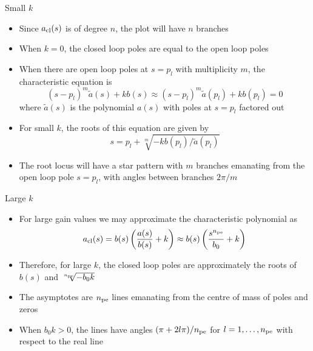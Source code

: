 \documentclass[10pt]{beamer-control}
\begin{document}
\begin{frame}{Small $k$}
	\begin{itemize}
		\item Since $a_{\text{cl}}(s)$ is of degree $n$, the plot will have $n$ branches
		\item When $k=0$, the closed loop poles are equal to the open loop poles
		\item When there are open loop poles at $s=p_l$ with multiplicity $m$, the characteristic equation is 
		\begin{equation}
			(s-p_l)^m\tilde{a}(s) + kb(s)\approx (s-p_l)^m\tilde{a}(p_l)+kb(p_l)=0
		\end{equation}
		where $\tilde{a}(s)$ is the polynomial $a(s)$ with poles at $s=p_l$ factored out
		\item For small $k$, the roots of this equation are given by 
		\begin{equation}
			s=p_l + \sqrt[m]{-kb(p_l)/\tilde{a}(p_l)}
		\end{equation}
		\item The root locus will have a star pattern with $m$ branches emanating from the open loop pole $s=p_l$, with angles between branches $2\pi/m$
	\end{itemize}
\end{frame}

\begin{frame}{Large $k$}
	\begin{itemize}
		\item For large gain values we may approximate the characteristic polynomial as
		\begin{equation}
			a_{\text{cl}}(s) = b(s)\left(\frac{a(s)}{b(s)}+k \right) \approx b(s)\left(\frac{s^{n_{\text{pe}}}}{b_0}+k \right)
		\end{equation}
		\item Therefore, for large $k$, the closed loop poles are approximately the roots of $b(s)$ and $\sqrt[n_{\text{pe}}]{-b_0k}$
		\item The asymptotes are $n_{\text{pe}}$ lines emanating from the centre of mass of poles and zeros
		\item When $b_0k>0$, the lines have angles $(\pi+2l\pi)/n_{\text{pe}}$ for $l=1,\dots,n_{\text{pe}}$ with respect to the real line
	\end{itemize}
\end{frame}
\end{document}
